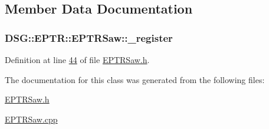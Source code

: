 \subsection{Member Data Documentation}
\hypertarget{class_d_s_g_1_1_e_p_t_r_1_1_e_p_t_r_saw_a38d89a4557f487e0e447e1da6acf7e5f}{
\subsubsection[{\+\_\+register}]{ D\+S\+G\+::\+E\+P\+T\+R\+::\+E\+P\+T\+R\+Saw\+::\+\_\+register\hspace{0.3cm}{\ttfamily [protected]}}}\label{class_d_s_g_1_1_e_p_t_r_1_1_e_p_t_r_saw_a38d89a4557f487e0e447e1da6acf7e5f}


Definition at line \hyperlink{_e_p_t_r_saw_8h_source_l00044}{44} of file \hyperlink{_e_p_t_r_saw_8h_source}{E\+P\+T\+R\+Saw.\+h}.



The documentation for this class was generated from the following files\+:\begin{DoxyCompactItemize}
\item 
\hyperlink{_e_p_t_r_saw_8h}{E\+P\+T\+R\+Saw.\+h}\item 
\hyperlink{_e_p_t_r_saw_8cpp}{E\+P\+T\+R\+Saw.\+cpp}\end{DoxyCompactItemize}
